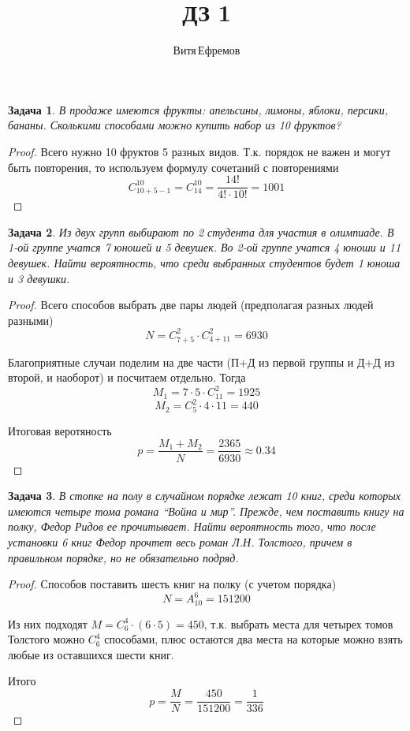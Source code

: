 \documentclass[a4paper,12pt]{article}
\newtheorem{problem}{Задача}
\newenvironment{solution}{\renewcommand{\proofname}{\unskip\indent\nopunct}\begin{proof}}{\end{proof}}
\begin{document}
\title{ДЗ 1}
\author{Витя\,Ефремов}
\maketitle


\begin{problem}
В продаже имеются фрукты: апельсины, лимоны, яблоки, персики, бананы.
Сколькими способами можно купить набор из 10 фруктов?
\end{problem}
\begin{solution}
Всего нужно 10 фруктов 5 разных видов. Т.к. порядок не важен и могут быть повторения, то используем формулу сочетаний с повторениями
$$C_{10+5-1}^{10} = C_{14}^{10} = \frac{14!}{4! \cdot 10!} = 1001$$
\end{solution}


\begin{problem}
Из двух групп выбирают по 2 студента для участия в олимпиаде. В 1-ой группе учатся 7 юношей и 5 девушек. Во 2-ой группе учатся 4 юноши и 11 девушек. Найти вероятность, что среди выбранных студентов будет 1 юноша и 3 девушки.
\end{problem}
\begin{solution}
Всего способов выбрать две пары людей (предполагая разных людей разными)
$$N = C_{7+5}^2 \cdot C_{4+11}^2 = 6930$$

Благоприятные случаи поделим на две части (П+Д из первой группы и Д+Д из второй, и наоборот) и посчитаем отдельно. Тогда
$$M_1 = 7 \cdot 5 \cdot C_{11}^2 = 1925$$
$$M_2 = C_5^2 \cdot 4 \cdot 11 = 440$$

Итоговая веротяность
$$p = \frac{M_1 + M_2}{N} = \frac{2365}{6930} \approx 0.34$$
\end{solution}


\begin{problem}
В стопке на полу в случайном порядке лежат 10 книг, среди которых имеются четыре тома романа “Война и мир”. Прежде, чем поставить книгу на полку, Федор Ридов ее прочитывает. Найти вероятность того, что после установки 6 книг Федор прочтет весь роман Л.Н. Толстого, причем в правильном порядке, но не обязательно подряд.
\end{problem}
\begin{solution}
Способов поставить шесть книг на полку (с учетом порядка)
$$N = A_{10}^6 = 151200$$

Из них подходят $M = C_6^4 \cdot (6 \cdot 5) = 450$, т.к. выбрать места для четырех томов Толстого можно $C_6^4$ способами, плюс остаются два места на которые можно взять любые из оставшихся шести книг.

Итого
$$p = \frac{M}{N} = \frac{450}{151200} = \frac{1}{336}$$
\end{solution}
\end{document}
